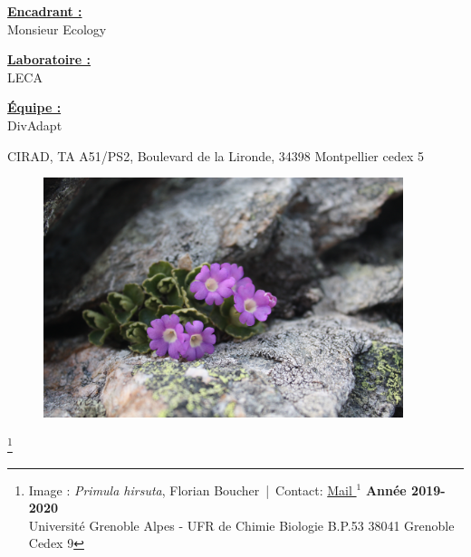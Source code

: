 \documentclass[12pt,a4paper,notitlepage,colorinlistoftodos]{article}
\begin{document}
{{\begin{titlepage}
\maketitle

\noindent
\begin{minipage}{1.8in}
\textbf{\underline{Encadrant :}} \\
Monsieur Ecology 
\end{minipage}
\hfill
\begin{minipage}{1.3in}
\textbf{\underline{Laboratoire :}} \\
LECA
\end{minipage}
\hfill
\begin{minipage}{1.3in}
\textbf{\underline{Équipe :}} \\
DivAdapt
\end{minipage}

\noindent
\begin{minipage}{1.8in}

\end{minipage}
\hfill
\begin{minipage}{3.55in}
CIRAD, TA A51/PS2, Boulevard de la Lironde, 34398 Montpellier cedex 5
\end{minipage}

\begin{figure}[h]
\begin{center}
\includegraphics[height = 7cm]{fig/Primula_hirsuta_Grand_Chat_longistyle.JPG}
\end{center}
\end{figure}
\thispagestyle{empty}

\renewcommand{\footnoterule}{%
  \kern -3pt
  \hrule width \textwidth height 1pt
  \kern 2pt
}

{\let\thefootnote\relax\footnote{{\noindent Image : \textit{Primula hirsuta}, Florian Boucher~|~Contact:  \href{mailto:maxime.jaunatre@etu.univ-grenoble-alpes.fr}{Mail $^1$}} 
\hfill \textbf{Année 2019-2020}\\
Université Grenoble Alpes - UFR de Chimie Biologie B.P.53 38041 Grenoble Cedex 9}}



\end{titlepage}}}
\end{document}
